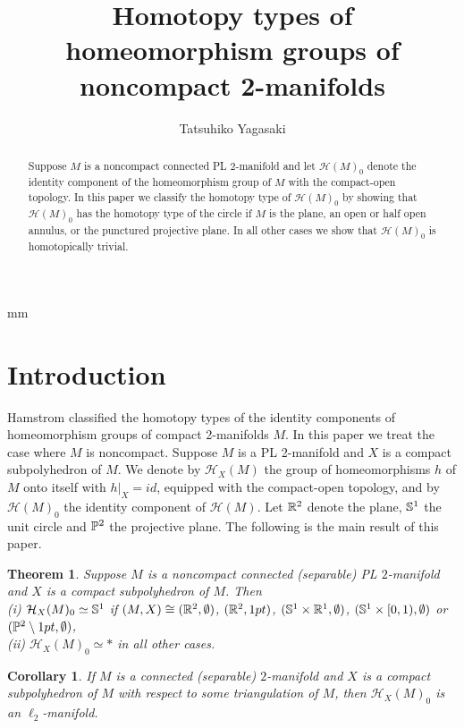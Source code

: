 \documentclass[11pt]{amsart}
\title{Homotopy types of homeomorphism groups of noncompact 2-manifolds}
\author{Tatsuhiko Yagasaki}
\newtheorem{theorem}{Theorem}[section]
\newtheorem{corollary}{Corollary}[section]
\theoremstyle{definition}
\newtheorem*{Proof of Theorem 3.1}{Proof of Theorem 3.1}
\newtheorem*{Proof of Corollary 3.1}{Proof of Corollary 3.1}
\newtheorem*{Proof of Proposition 4.1.(1)}{Proof of Proposition 4.1.(1)}
\newtheorem*{Proof of Proposition 4.1.(2)}{Proof of Proposition 4.1.(2)}
\newtheorem*{Proof of Corollary 1.1}{Proof of Corollary 1.1}
\def \cal {\mathcal}
\begin{document}
 mm

\thispagestyle{empty}

\maketitle
\begin{abstract}
Suppose $M$ is a noncompact connected PL 2-manifold and let ${\cal H}(M)_0$ denote the identity component of the homeomorphism group of $M$ with the compact-open topology. In this paper we classify the homotopy type of ${\cal H}(M)_0$ by showing that ${\cal H}(M)_0$ has the homotopy type of the circle if $M$ is the plane, an open or half open annulus, or the punctured projective plane. In all other cases we show that ${\cal H}(M)_0$ is homotopically trivial.
\end{abstract}


\section{Introduction}

Hamstrom \cite{Ha} classified the homotopy types of the identity components of homeomorphism groups of compact 2-manifolds $M$. In this paper we treat the case where $M$ is noncompact. Suppose $M$ is a PL 2-manifold and $X$ is a compact subpolyhedron of $M$. We denote by ${\cal H}_X(M)$ the group of homeomorphisms $h$ of $M$ onto itself with $h|_X =id$, equipped with the compact-open topology, and by ${\cal H}(M)_0$ the identity component of ${\cal H}(M)$. Let ${\Bbb R}^2$ denote the plane, ${\Bbb S}^1$ the unit circle and ${\Bbb P}^2$ the projective plane. The following is the main result of this paper.

\begin{theorem}
Suppose $M$ is a noncompact connected (separable) PL $2$-manifold and $X$ is a compact subpolyhedron of $M$. Then \\
{\rm (i)} ${\cal H}_X(M)_0 \simeq {\Bbb S}^1$ if $(M, X) \cong ({\Bbb R}^2, \emptyset)$, $({\Bbb R}^2, 1pt)$, $({\Bbb S}^1 \times {\Bbb R}^1, \emptyset)$, $({\Bbb S}^1 \times [0, 1), \emptyset)$ or $({\Bbb P}^2 \setminus 1pt, \emptyset)$, \\
{\rm (ii)} ${\cal H}_X(M)_0 \simeq \ast$ in all other cases.  
\end{theorem}

\begin{corollary}
If $M$ is a connected (separable) $2$-manifold and $X$ is a compact subpolyhedron of $M$ with respect to some triangulation of $M$, then ${\cal H}_X(M)_0$ is an $\ell_2$-manifold. 
\end{corollary}
\end{document}

